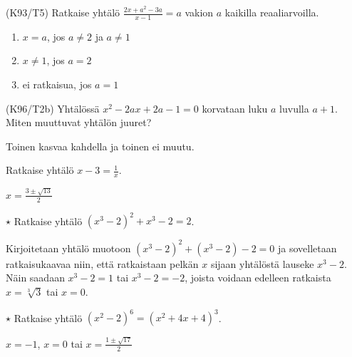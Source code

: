 \begin{tehtavasivu}
\begin{tehtava}
(K93/T5) Ratkaise yhtälö
        $\frac{2x+a^2-3a}{x-1}=a$ vakion $a$ kaikilla reaaliarvoilla.
\begin{vastaus}
        \begin{enumerate}
         \item{$x=a$, jos $a \neq 2$ ja $a \neq 1$}
         \item{$x\neq 1$, jos $a=2$}
         \item{ei ratkaisua, jos $a=1$}
        \end{enumerate}
    \end{vastaus}
\end{tehtava}

\begin{tehtava}
(K96/T2b) Yhtälössä $x^2-2ax+2a-1=0$ korvataan luku $a$ luvulla $a+1$. Miten muuttuvat yhtälön juuret?
\begin{vastaus}
     Toinen kasvaa kahdella ja toinen ei muutu.
    \end{vastaus}
\end{tehtava}

\begin{tehtava}
Ratkaise yhtälö $x - 3 = \frac{1}{x}$.
    \begin{vastaus}
    $x =\frac{3 \pm \sqrt{13}}{2}$
    \end{vastaus}
\end{tehtava}

\begin{tehtava} %
	$\star$ Ratkaise yhtälö $(x^3-2)^2+x^3-2=2$.
	\begin{vastaus}
		Kirjoitetaan yhtälö muotoon $(x^3-2)^2+(x^3-2)-2=0$ ja sovelletaan ratkaisukaavaa niin, että ratkaistaan pelkän $x$ sijaan yhtälöstä lauseke $x^3-2$. Näin saadaan $x^3-2=1$ tai $x^3-2=-2$, joista voidaan edelleen ratkaista $x=\sqrt[3]{3}$ tai $x=0$.
	\end{vastaus}
\end{tehtava}

\begin{tehtava}
	$\star$ Ratkaise yhtälö $(x^2-2)^6=(x^2+4x+4)^3$.
	\begin{vastaus}
		$x=-1$, $x=0$ tai $x=\frac{1 \pm \sqrt{17}}{2}$
	\end{vastaus}
\end{tehtava}

\end{tehtavasivu}